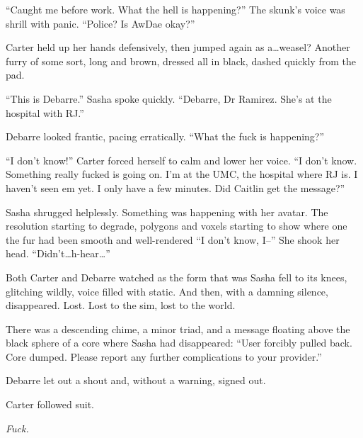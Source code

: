 ``Caught me before work. What the hell is happening?'' The skunk's voice was shrill with panic. ``Police? Is AwDae okay?''

Carter held up her hands defensively, then jumped again as a\ldots{}weasel? Another furry of some sort, long and brown, dressed all in black, dashed quickly from the pad.

``This is Debarre.'' Sasha spoke quickly. ``Debarre, Dr Ramirez. She's at the hospital with RJ.''

Debarre looked frantic, pacing erratically. ``What the fuck is happening?''

``I don't know!'' Carter forced herself to calm and lower her voice. ``I don't know. Something really fucked is going on. I'm at the UMC, the hospital where RJ is. I haven't seen em yet. I only have a few minutes. Did Caitlin get the message?''

Sasha shrugged helplessly. Something was happening with her avatar. The resolution starting to degrade, polygons and voxels starting to show where one the fur had been smooth and well-rendered ``I don't know, I--'' She shook her head. ``Didn't\ldots{}h-hear\ldots{}''

Both Carter and Debarre watched as the form that was Sasha fell to its knees, glitching wildly, voice filled with static. And then, with a damning silence, disappeared. Lost. Lost to the sim, lost to the world.

There was a descending chime, a minor triad, and a message floating above the black sphere of a core where Sasha had disappeared: ``User forcibly pulled back. Core dumped. Please report any further complications to your provider.''

Debarre let out a shout and, without a warning, signed out.

Carter followed suit.

\emph{Fuck.}
